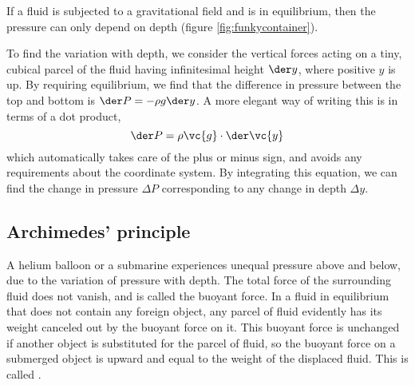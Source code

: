If a fluid is subjected to a gravitational field and is in equilibrium, then
the pressure can only depend on depth (figure \ref{fig:funkycontainer}).


To find the variation with depth, we consider the vertical
forces acting on a tiny, cubical parcel of the fluid having infinitesimal
height $\der y$, where positive $y$ is up.
By requiring equilibrium, we find that the difference in pressure
between the top and bottom is
$\der P  =  -\rho g \der y$.
A more elegant way of writing this is in terms
of a dot product, 
\begin{equation}
  \der P = \rho\vc{g}\cdot\der\vc{y}
\end{equation}
which automatically takes care of the plus or minus sign, and avoids
any requirements about the coordinate system. By integrating this equation,
we can find the change in pressure $\Delta P$ corresponding to any change
in depth $\Delta y$.

\subsection{Archimedes' principle}

A helium balloon or a submarine experiences unequal pressure above and below, due to the
variation of pressure with depth. The total force of the surrounding fluid does not vanish,
and is called the buoyant force. In a fluid in equilibrium that does not contain any foreign object,
any parcel of fluid evidently has its weight canceled out by the buoyant force on it. This buoyant
force is unchanged if another object is substituted for the parcel of fluid, so
the buoyant force on a submerged object is upward and equal to the weight of
the displaced fluid. This is called .
